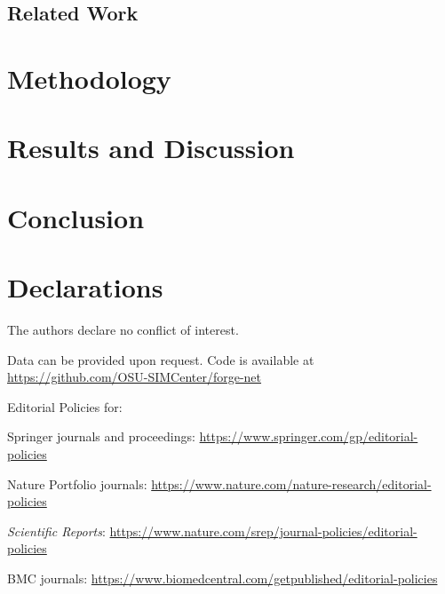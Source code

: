 \documentclass[pdflatex,sn-mathphys-num]{sn-jnl}%
\theoremstyle{thmstyleone}%
\theoremstyle{thmstyletwo}%
\theoremstyle{thmstylethree}%
\begin{document}
\subsection{Related Work}



\section{Methodology}



\section{Results and Discussion}\label{sec12}

\section{Conclusion}\label{sec13}



\section*{Declarations}

 The authors declare no conflict of interest.

 Data can be provided upon request. Code is available at \url{https://github.com/OSU-SIMCenter/forge-net}


\bigskip
\begin{flushleft}%
Editorial Policies for:

\bigskip\noindent
Springer journals and proceedings: \url{https://www.springer.com/gp/editorial-policies}

\bigskip\noindent
Nature Portfolio journals: \url{https://www.nature.com/nature-research/editorial-policies}

\bigskip\noindent
\textit{Scientific Reports}: \url{https://www.nature.com/srep/journal-policies/editorial-policies}

\bigskip\noindent
BMC journals: \url{https://www.biomedcentral.com/getpublished/editorial-policies}
\end{flushleft}
\end{document}
